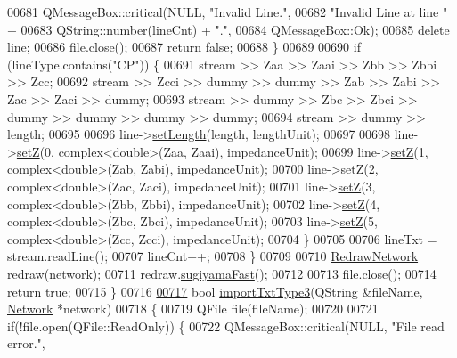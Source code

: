 \begin{DoxyCode}
00681       QMessageBox::critical(NULL, \textcolor{stringliteral}{"Invalid Line."},
00682                             \textcolor{stringliteral}{"Invalid Line at line "} +
00683                             QString::number(lineCnt) + \textcolor{stringliteral}{"."},
00684                             QMessageBox::Ok);
00685       \textcolor{keyword}{delete} line;
00686       file.close();
00687       \textcolor{keywordflow}{return} \textcolor{keyword}{false};
00688     \}
00689 
00690     \textcolor{keywordflow}{if} (lineType.contains(\textcolor{stringliteral}{"CP"})) \{
00691       stream >> Zaa >> Zaai >> Zbb >> Zbbi >> Zcc;
00692       stream >> Zcci >> dummy >> dummy >> Zab >> Zabi >> Zac >> Zaci >> dummy;
00693       stream >> dummy >> Zbc >> Zbci >> dummy >> dummy >> dummy >> dummy;
00694       stream >> dummy >> length;
00695 
00696       line->\hyperlink{group___models_ga950d0b8f5d167eda430c65ca7adadbb0}{setLength}(length, lengthUnit);
00697 
00698       line->\hyperlink{group___models_ga2b8fe47ae4ae2d4422d9431e17b4927d}{setZ}(0, complex<double>(Zaa, Zaai), impedanceUnit);
00699       line->\hyperlink{group___models_ga2b8fe47ae4ae2d4422d9431e17b4927d}{setZ}(1, complex<double>(Zab, Zabi), impedanceUnit);
00700       line->\hyperlink{group___models_ga2b8fe47ae4ae2d4422d9431e17b4927d}{setZ}(2, complex<double>(Zac, Zaci), impedanceUnit);
00701       line->\hyperlink{group___models_ga2b8fe47ae4ae2d4422d9431e17b4927d}{setZ}(3, complex<double>(Zbb, Zbbi), impedanceUnit);
00702       line->\hyperlink{group___models_ga2b8fe47ae4ae2d4422d9431e17b4927d}{setZ}(4, complex<double>(Zbc, Zbci), impedanceUnit);
00703       line->\hyperlink{group___models_ga2b8fe47ae4ae2d4422d9431e17b4927d}{setZ}(5, complex<double>(Zcc, Zcci), impedanceUnit);
00704     \}
00705 
00706     lineTxt = stream.readLine();
00707     lineCnt++;
00708   \}
00709 
00710   \hyperlink{class_redraw_network}{RedrawNetwork} redraw(network);
00711   redraw.\hyperlink{group___algorithms_ga94d53ddf8ee00c4ef6d56bb988333103}{sugiyamaFast}();
00712 
00713   file.close();
00714   \textcolor{keywordflow}{return} \textcolor{keyword}{true};
00715 \}
00716 
\hypertarget{import_8cpp_source_l00717}{}\hyperlink{import_8h_acd1a54d4b2a28043b1489f0be7423ecd}{00717} \textcolor{keywordtype}{bool} \hyperlink{import_8cpp_acd1a54d4b2a28043b1489f0be7423ecd}{importTxtType3}(QString &fileName, \hyperlink{class_network}{Network} *network)
00718 \{
00719   QFile file(fileName);
00720 
00721   \textcolor{keywordflow}{if}(!file.open(QFile::ReadOnly)) \{
00722     QMessageBox::critical(NULL, \textcolor{stringliteral}{"File read error."},

\end{DoxyCode}
